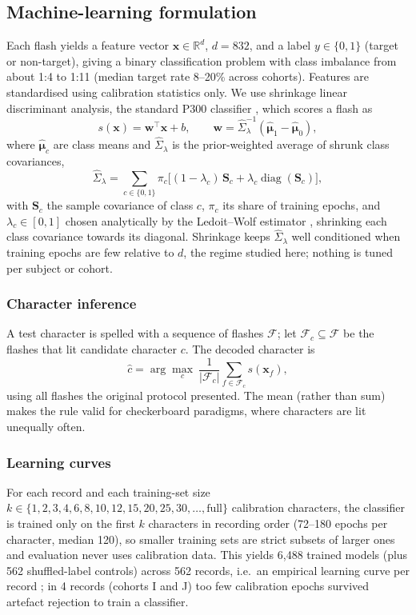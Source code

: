 \documentclass[conference]{IEEEtran}
\begin{document}
\subsection{Machine-learning formulation}
Each flash yields a feature vector $\mathbf{x}\in\mathbb{R}^{d}$, $d=832$, and a label $y\in\{0,1\}$ (target or non-target), giving a binary classification problem with class imbalance from about 1:4 to 1:11 (median target rate 8--20\% across cohorts). Features are standardised using calibration statistics only. We use shrinkage linear discriminant analysis, the standard P300 classifier \cite{blankertz2011}, which scores a flash as
\begin{equation}
s(\mathbf{x})=\mathbf{w}^{\top}\mathbf{x}+b,\qquad \mathbf{w}=\hat{\Sigma}_{\lambda}^{-1}(\hat{\boldsymbol\mu}_1-\hat{\boldsymbol\mu}_0),
\end{equation}
where $\hat{\boldsymbol\mu}_c$ are class means and $\hat{\Sigma}_{\lambda}$ is the prior-weighted average of shrunk class covariances,
\begin{equation}
\hat{\Sigma}_{\lambda}=\sum_{c\in\{0,1\}}\pi_c\big[(1-\lambda_c)\,\mathbf{S}_c+\lambda_c\operatorname{diag}(\mathbf{S}_c)\big],
\end{equation}
with $\mathbf{S}_c$ the sample covariance of class $c$, $\pi_c$ its share of training epochs, and $\lambda_c\in[0,1]$ chosen analytically by the Ledoit--Wolf estimator \cite{ledoit2004}, shrinking each class covariance towards its diagonal. Shrinkage keeps $\hat{\Sigma}_{\lambda}$ well conditioned when training epochs are few relative to $d$, the regime studied here; nothing is tuned per subject or cohort.

\subsubsection{Character inference}
A test character is spelled with a sequence of flashes $\mathcal{F}$; let $\mathcal{F}_c\subseteq\mathcal{F}$ be the flashes that lit candidate character $c$. The decoded character is
\begin{equation}
\hat{c}=\arg\max_{c}\ \frac{1}{|\mathcal{F}_c|}\sum_{f\in\mathcal{F}_c}s(\mathbf{x}_f),
\end{equation}
using all flashes the original protocol presented. The mean (rather than sum) makes the rule valid for checkerboard paradigms, where characters are lit unequally often.

\subsubsection{Learning curves}
For each record and each training-set size $k\in\{1,2,3,4,6,8,10,12,15,20,25,30,\dots,\text{full}\}$ calibration characters, the classifier is trained only on the first $k$ characters in recording order (72--180 epochs per character, median 120), so smaller training sets are strict subsets of larger ones and evaluation never uses calibration data. This yields 6{,}488 trained models (plus 562 shuffled-label controls) across 562 records, i.e.\ an empirical learning curve per record \cite{viering2023}; in 4 records (cohorts I and J) too few calibration epochs survived artefact rejection to train a classifier.
\end{document}
